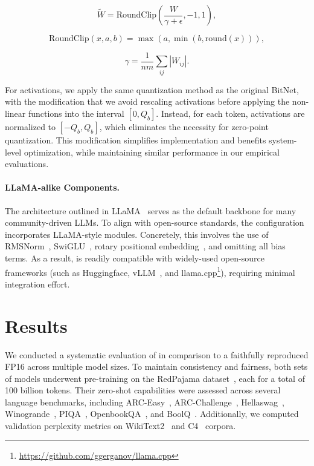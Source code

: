 \begin{equation}
    \widetilde{W} = \mathrm{RoundClip}(\frac{W}{\gamma + \epsilon}, -1, 1),
\end{equation}

\begin{equation}
    \mathrm{RoundClip}(x, a, b) = \max(a, \min(b, \mathrm{round}(x))),
\end{equation}

\begin{equation}
    \gamma = \frac{1}{nm}\sum_{ij} |W_{ij}|.
\end{equation}

For activations, we apply the same quantization method as the original BitNet, with the modification that we avoid rescaling activations before applying the non-linear functions into the interval $[0, Q_b]$. Instead, for each token, activations are normalized to $[-Q_b, Q_b]$, which eliminates the necessity for zero-point quantization. This modification simplifies implementation and benefits system-level optimization, while maintaining similar performance in our empirical evaluations.

\paragraph{LLaMA-alike Components.}

The architecture outlined in LLaMA~\cite{llama, llama2} serves as the default backbone for many community-driven LLMs. To align with open-source standards, the  configuration incorporates LLaMA-style modules. Concretely, this involves the use of RMSNorm~\cite{rmsnorm}, SwiGLU~\cite{swiglu}, rotary positional embedding~\cite{rope}, and omitting all bias terms. As a result,  is readily compatible with widely-used open-source frameworks (such as Huggingface, vLLM~\cite{vllm}, and llama.cpp\footnote{\url{https://github.com/ggerganov/llama.cpp}}), requiring minimal integration effort.

\section{Results}

We conducted a systematic evaluation of  in comparison to a faithfully reproduced FP16  across multiple model sizes. To maintain consistency and fairness, both sets of models underwent pre-training on the RedPajama dataset~\cite{redpajama}, each for a total of 100 billion tokens. Their zero-shot capabilities were assessed across several language benchmarks, including ARC-Easy~\cite{arc}, ARC-Challenge~\cite{arc}, Hellaswag~\cite{hellaswag}, Winogrande~\cite{winoGrande}, PIQA~\cite{piqa}, OpenbookQA~\cite{openbookqa}, and BoolQ~\cite{boolq}. Additionally, we computed validation perplexity metrics on WikiText2~\cite{wikitext2} and C4~\cite{c4} corpora.

